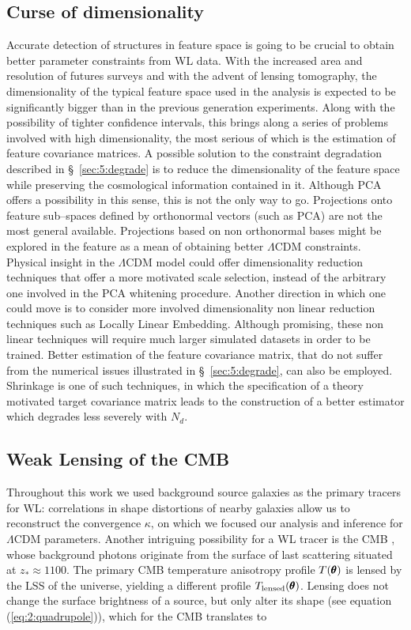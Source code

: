 \subsection{Curse of dimensionality}
Accurate detection of structures in feature space is going to be crucial to obtain better parameter constraints from WL data. With the increased area and resolution of futures surveys and with the advent of lensing tomography, the dimensionality of the typical feature space used in the analysis is expected to be significantly bigger than in the previous generation experiments. Along with the possibility of tighter confidence intervals, this brings along a series of problems involved with high dimensionality, the most serious of which is the estimation of feature covariance matrices. A possible solution to the constraint degradation described in \S~\ref{sec:5:degrade} is to reduce the dimensionality of the feature space while preserving the cosmological information contained in it. Although PCA offers a possibility in this sense, this is not the only way to go. Projections onto feature sub--spaces defined by orthonormal vectors (such as PCA) are not the most general available. Projections based on non orthonormal bases might be explored in the feature as a mean of obtaining better $\Lambda$CDM constraints. Physical insight in the $\Lambda$CDM model could offer dimensionality reduction techniques that offer a more motivated scale selection, instead of the arbitrary one involved in the PCA whitening procedure. Another direction in which one could move is to consider more involved dimensionality non linear reduction techniques such as Locally Linear Embedding. Although promising, these non linear techniques will require much larger simulated datasets in order to be trained. Better estimation of the feature covariance matrix, that do not suffer from the numerical issues illustrated in \S~\ref{sec:5:degrade}, can also be employed. Shrinkage \citep{ShrinkagePope} is one of such techniques, in which the specification of a theory motivated target covariance matrix leads to the construction of a better estimator which degrades less severely with $N_d$.    

\subsection{Weak Lensing of the CMB}
Throughout this work we used background source galaxies as the primary tracers for WL: correlations in shape distortions of nearby galaxies allow us to reconstruct the convergence $\kappa$, on which we focused our analysis and inference for $\Lambda$CDM parameters. Another intriguing possibility for a WL tracer is the CMB \citep{CMBLens}, whose background photons originate from the surface of last scattering situated at $z_*\approx 1100$. The primary CMB temperature anisotropy profile $T(\pmb{\theta})$ is lensed by the LSS of the universe, yielding a different profile $T_{\rm lensed}(\pmb{\theta})$. Lensing does not change the surface brightness of a source, but only alter its shape (see equation (\ref{eq:2:quadrupole})), which for the CMB translates to 


